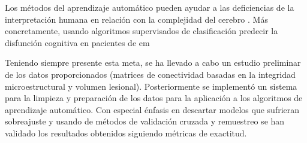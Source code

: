Los métodos del aprendizaje automático pueden ayudar a las deficiencias de la interpretación humana en relación con la complejidad del cerebro \cite{Lemm2011IntroductionImaging}. Más concretamente, usando algoritmos supervisados de clasificación predecir la disfunción cognitiva en pacientes de \gls{em}

Teniendo siempre presente esta meta, se ha llevado a cabo un estudio preliminar de los datos proporcionados (matrices de conectividad basadas en la integridad microestructural y volumen lesional). Posteriormente se implementó un sistema para la limpieza y preparación de los datos para la aplicación a los algoritmos de aprendizaje automático. Con especial énfasis en descartar modelos que sufrieran sobreajuste y usando de métodos de validación cruzada y remuestreo se han validado los resultados obtenidos siguiendo métricas de exactitud.